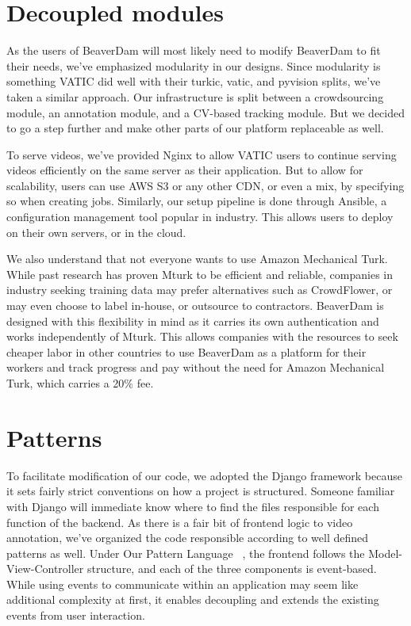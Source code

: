 \section{Decoupled modules}

As the users of BeaverDam will most likely need to modify BeaverDam to fit their needs,
we've emphasized modularity in our designs.
Since modularity is something VATIC did well with their turkic, vatic, and pyvision splits,
we've taken a similar approach.
Our infrastructure is split between a crowdsourcing module, an annotation module, and a CV-based tracking module.
But we decided to go a step further and make other parts of our platform replaceable as well.

To serve videos, we've provided Nginx to allow VATIC users to continue serving videos efficiently on the same server as their application.
But to allow for scalability, users can use AWS S3 or any other CDN, or even a mix, by specifying so when creating jobs.
Similarly, our setup pipeline is done through Ansible, a configuration management tool popular in industry.
This allows users to deploy on their own servers, or in the cloud.

We also understand that not everyone wants to use Amazon Mechanical Turk.
While past research has proven Mturk to be efficient and reliable,
companies in industry seeking training data may prefer alternatives such as CrowdFlower,
or may even choose to label in-house, or outsource to contractors.
BeaverDam is designed with this flexibility in mind as it carries its own authentication and works independently of Mturk.
This allows companies with the resources to seek cheaper labor in other countries to use BeaverDam as a platform for their workers
and track progress and pay without the need for Amazon Mechanical Turk, which carries a 20\% fee.

\section{Patterns}

To facilitate modification of our code, we adopted the Django framework because it sets fairly strict conventions on how a project is structured.
Someone familiar with Django will immediate know where to find the files responsible for each function of the backend.
As there is a fair bit of frontend logic to video annotation, we've organized the code responsible according to well defined patterns as well.
Under Our Pattern Language ~\cite{opl}, the frontend follows the Model-View-Controller structure, and each of the three components is event-based.
While using events to communicate within an application may seem like additional complexity at first, it enables decoupling and extends the existing events from user interaction.

